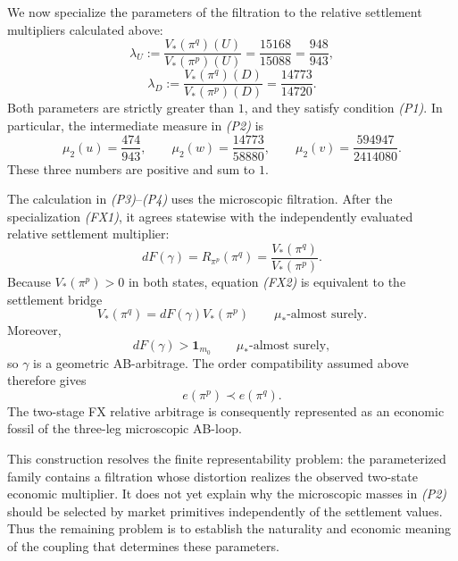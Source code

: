 \documentclass[11pt,a4paper]{article}
\begin{document}
We now specialize the parameters of the filtration to the relative
settlement multipliers calculated above:
\[
  \lambda_U
  :=\frac{V_*(\pi^q)(U)}{V_*(\pi^p)(U)}
  =\frac{15168}{15088}
  =\frac{948}{943},
\]
\[
  \lambda_D
  :=\frac{V_*(\pi^q)(D)}{V_*(\pi^p)(D)}
  =\frac{14773}{14720}.
  \tag{FX1}
\]
Both parameters are strictly greater than $1$, and they satisfy
condition \emph{(P1)}. In particular, the intermediate measure in
\emph{(P2)} is
\[
  \mu_2(u)=\frac{474}{943},
  \qquad
  \mu_2(w)=\frac{14773}{58880},
  \qquad
  \mu_2(v)=\frac{594947}{2414080}.
\]
These three numbers are positive and sum to $1$.

The calculation in \emph{(P3)}--\emph{(P4)} uses the microscopic filtration. After the specialization \emph{(FX1)}, it agrees
statewise with the independently evaluated relative settlement multiplier:
\[
  dF(\gamma)
  =R_{\pi^p}(\pi^q)
  =\frac{V_*(\pi^q)}{V_*(\pi^p)}.
  \tag{FX2}
\]
Because $V_*(\pi^p)>0$ in both states, equation \emph{(FX2)} is equivalent
to the settlement bridge
\[
  V_*(\pi^q)=dF(\gamma)V_*(\pi^p)
  \qquad \mu_*\text{-almost surely}.
  \tag{FX3}
\]
Moreover,
\[
  dF(\gamma)>\mathbf1_{m_0}
  \qquad \mu_*\text{-almost surely},
\]
so $\gamma$ is a geometric AB-arbitrage. The order compatibility assumed
above therefore gives
\[
  e(\pi^p)\prec e(\pi^q).
\]
The two-stage FX relative arbitrage is consequently represented as an
economic fossil of the three-leg microscopic AB-loop.

This construction resolves the finite representability problem: the
parameterized family contains a filtration whose distortion realizes the
observed two-state economic multiplier. It does not yet explain why the
microscopic masses in \emph{(P2)} should be selected by market primitives
independently of the settlement values. 
Thus the remaining problem is to establish the naturality and economic
meaning of the coupling that determines these parameters.
\end{document}
